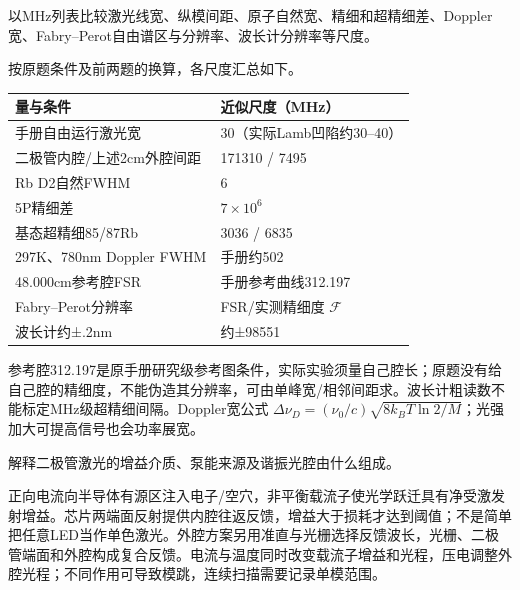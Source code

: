 \begin{exercise}\label{task:exp48-4}
以MHz列表比较激光线宽、纵模间距、原子自然宽、精细和超精细差、Doppler宽、Fabry--Perot自由谱区与分辨率、波长计分辨率等尺度。
\end{exercise}
\begin{solution}
按原题条件及前两题的换算，各尺度汇总如下。
\begin{center}\begin{tabular}{p{.49\linewidth}|p{.4\linewidth}}量与条件&近似尺度（MHz）\\\hline
手册自由运行激光宽&30（实际Lamb凹陷约30--40）\\
二极管内腔/上述2cm外腔间距&171310 / 7495\\
Rb D2自然FWHM&6\\
5P精细差&$7\times10^6$\\
基态超精细85/87Rb&3036 / 6835\\
297K、780nm Doppler FWHM&手册约502\\
48.000cm参考腔FSR&手册参考曲线312.197\\
Fabry--Perot分辨率&FSR/实测精细度 $\mathcal F$\\
波长计约±.2nm&约±98551
\end{tabular}\end{center}
参考腔312.197是原手册研究级参考图条件，实际实验须量自己腔长；原题没有给自己腔的精细度，不能伪造其分辨率，可由单峰宽/相邻间距求。波长计粗读数不能标定MHz级超精细间隔。Doppler宽公式 $\Delta\nu_D=(\nu_0/c)\sqrt{8k_BT\ln2/M}$；光强加大可提高信号也会功率展宽。
\end{solution}
\begin{exercise}\label{task:exp48-5}
解释二极管激光的增益介质、泵能来源及谐振光腔由什么组成。
\end{exercise}
\begin{solution}
正向电流向半导体有源区注入电子/空穴，非平衡载流子使光学跃迁具有净受激发射增益。芯片两端面反射提供内腔往返反馈，增益大于损耗才达到阈值；不是简单把任意LED当作单色激光。外腔方案另用准直与光栅选择反馈波长，光栅、二极管端面和外腔构成复合反馈。电流与温度同时改变载流子增益和光程，压电调整外腔光程；不同作用可导致模跳，连续扫描需要记录单模范围。
\end{solution}

